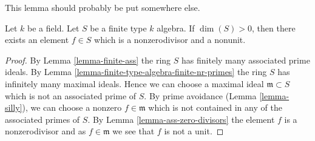 \noindent
This lemma should probably be put somewhere else.

\begin{lemma}
\label{lemma-dim-not-zero-exists-nonzerodivisor-nonunit}
Let $k$ be a field. Let $S$ be a finite type $k$ algebra.
If $\dim(S) > 0$, then there exists an element $f \in S$
which is a nonzerodivisor and a nonunit.
\end{lemma}

\begin{proof}
By Lemma \ref{lemma-finite-ass} the ring $S$ has finitely many associated
prime ideals. By Lemma \ref{lemma-finite-type-algebra-finite-nr-primes}
the ring $S$ has infinitely many maximal ideals. Hence we can choose
a maximal ideal $\mathfrak m \subset S$ which is not an associated prime
of $S$. By prime avoidance (Lemma \ref{lemma-silly}),
we can choose a nonzero $f \in \mathfrak m$ 
which is not contained in any of the associated primes of $S$.
By Lemma \ref{lemma-ass-zero-divisors} the element $f$ is a nonzerodivisor
and as $f \in \mathfrak m$ we see that $f$ is not a unit.
\end{proof}



